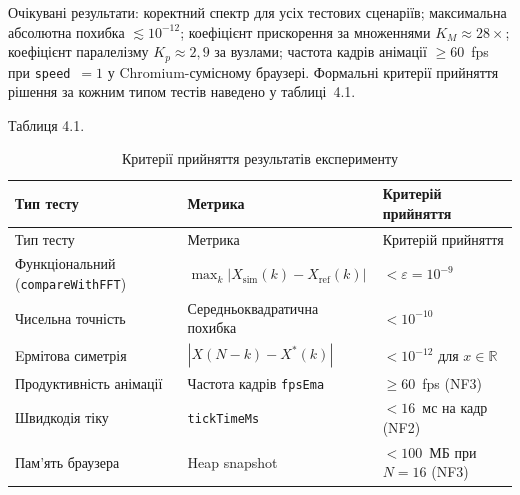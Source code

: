 \documentclass[
]{article}
\begin{document}
Очікувані результати: коректний спектр для усіх тестових сценаріїв;
максимальна абсолютна похибка \(\lesssim 10^{- 12}\); коефіцієнт
прискорення за множеннями \(K_{M} \approx 28 \times\); коефіцієнт
паралелізму \(K_{p} \approx 2,9\) за вузлами; частота кадрів анімації
\(\geq 60\)~fps при \texttt{speed}~\(= 1\) у Chromium-сумісному
браузері. Формальні критерії прийняття рішення за кожним типом тестів
наведено у таблиці~4.1.

Таблиця 4.1.

\begin{longtable}[]{@{}
  >{\raggedright\arraybackslash}p{}
  >{\raggedright\arraybackslash}p{}
  >{\raggedright\arraybackslash}p{}@{}}
\caption{Критерії прийняття результатів експерименту}\tabularnewline
\toprule\noalign{}
\begin{minipage}[b]{\linewidth}\raggedright
Тип тесту
\end{minipage} & \begin{minipage}[b]{\linewidth}\raggedright
Метрика
\end{minipage} & \begin{minipage}[b]{\linewidth}\raggedright
Критерій прийняття
\end{minipage} \\
\midrule\noalign{}
\endfirsthead
\toprule\noalign{}
\begin{minipage}[b]{\linewidth}\raggedright
Тип тесту
\end{minipage} & \begin{minipage}[b]{\linewidth}\raggedright
Метрика
\end{minipage} & \begin{minipage}[b]{\linewidth}\raggedright
Критерій прийняття
\end{minipage} \\
\midrule\noalign{}
\endhead
\bottomrule\noalign{}
\endlastfoot
Функціональний (\texttt{compareWithFFT}) &
\(\max_{k}|X_{\text{sim}}(k) - X_{\text{ref}}(k)|\) &
\(< \varepsilon = 10^{- 9}\) \\
Чисельна точність & Середньоквадратична похибка & \(< 10^{- 10}\) \\
Eрмітова симетрія & \(|X(N - k) - X^{*}(k)|\) & \(< 10^{- 12}\) для
\(x\mathbb{\in R}\) \\
Продуктивність анімації & Частота кадрів \texttt{fpsEma} &
\(\geq 60\)~fps (NF3) \\
Швидкодія тіку & \texttt{tickTimeMs} & \(< 16\)~мс на кадр (NF2) \\
Пам'ять браузера & Heap snapshot & \(< 100\)~МБ при \(N = 16\) (NF3) \\
\end{longtable}
\end{document}
